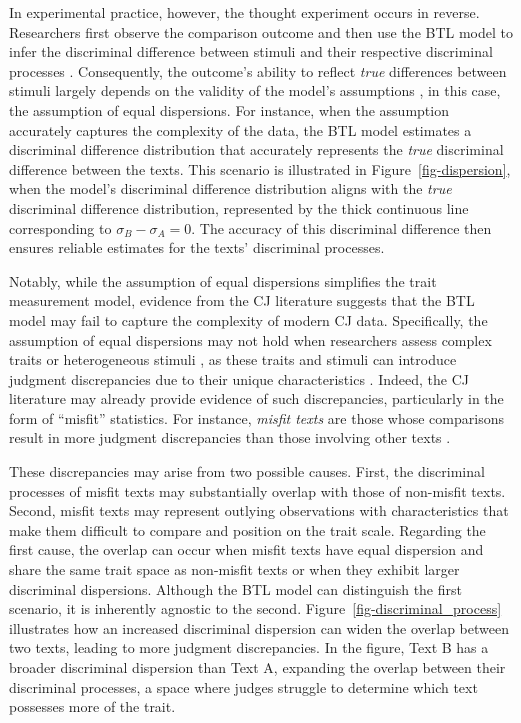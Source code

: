 \documentclass[
  authoryear,
  review,
  1p]{elsarticle}
\begin{document}
In experimental practice, however, the thought experiment occurs in
reverse. Researchers first observe the comparison outcome and then use
the BTL model to infer the discriminal difference between stimuli and
their respective discriminal processes \citep[pp.~373]{Thurstone_1927a}.
Consequently, the outcome's ability to reflect \emph{true} differences
between stimuli largely depends on the validity of the model's
assumptions \citep[pp.~150]{Kohler_et_al_2019}, in this case, the
assumption of equal dispersions. For instance, when the assumption
accurately captures the complexity of the data, the BTL model estimates
a discriminal difference distribution that accurately represents the
\emph{true} discriminal difference between the texts. This scenario is
illustrated in Figure~\ref{fig-dispersion}, when the model's discriminal
difference distribution aligns with the \emph{true} discriminal
difference distribution, represented by the thick continuous line
corresponding to \(\sigma_{B}-\sigma_{A}=0\). The accuracy of this
discriminal difference then ensures reliable estimates for the texts'
discriminal processes.

Notably, while the assumption of equal dispersions simplifies the trait
measurement model, evidence from the CJ literature suggests that the BTL
model may fail to capture the complexity of modern CJ data.
Specifically, the assumption of equal dispersions may not hold when
researchers assess complex traits or heterogeneous stimuli
\citetext{\citealp[pp.~376]{Thurstone_1927a}; \citealp[pp.~273]{Bramley_2008}; \citealp[pp.~678]{Kelly_et_al_2022}},
as these traits and stimuli can introduce judgment discrepancies due to
their unique characteristics
\citep{vanDaal_et_al_2016, Lesterhuis_2018, Chambers_et_al_2022}.
Indeed, the CJ literature may already provide evidence of such
discrepancies, particularly in the form of ``misfit'' statistics. For
instance, \emph{misfit texts} are those whose comparisons result in more
judgment discrepancies than those involving other texts
\citetext{\citealp[pp.~11]{Pollitt_2004}; \citealp[pp.~290]{Pollitt_2012b}}.

These discrepancies may arise from two possible causes. First, the
discriminal processes of misfit texts may substantially overlap with
those of non-misfit texts. Second, misfit texts may represent outlying
observations with characteristics that make them difficult to compare
and position on the trait scale. Regarding the first cause, the overlap
can occur when misfit texts have equal dispersion and share the same
trait space as non-misfit texts or when they exhibit larger discriminal
dispersions. Although the BTL model can distinguish the first scenario,
it is inherently agnostic to the second.
Figure~\ref{fig-discriminal_process} illustrates how an increased
discriminal dispersion can widen the overlap between two texts, leading
to more judgment discrepancies. In the figure, Text B has a broader
discriminal dispersion than Text A, expanding the overlap between their
discriminal processes, a space where judges struggle to determine which
text possesses more of the trait.
\end{document}
